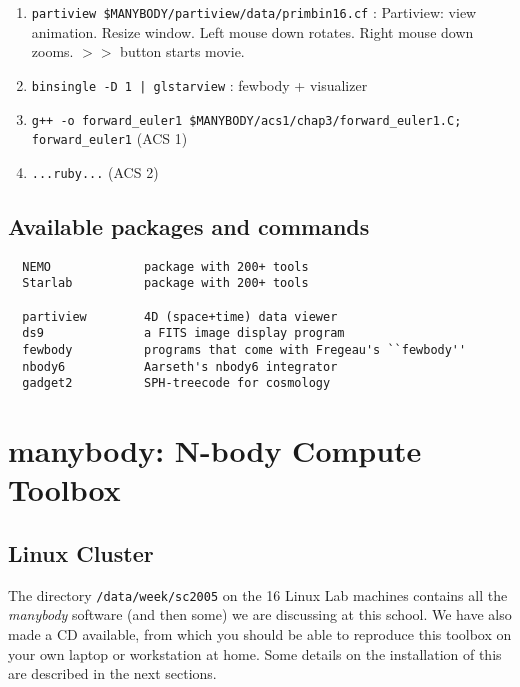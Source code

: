 \begin{enumerate}
\item
{\tt partiview  \$MANYBODY/partiview/data/primbin16.cf} : Partiview: view animation. Resize window.
Left mouse down rotates. Right mouse down zooms. $>>$ button starts movie.

\item
{\tt binsingle -D 1 | glstarview} : fewbody + visualizer

\item
{\tt g++ -o forward\_euler1 \$MANYBODY/acs1/chap3/forward\_euler1.C; forward\_euler1} 
(ACS 1)

\item
{\tt ...ruby...}
(ACS 2)


\end{enumerate}

\section{Available packages and commands}

\begin{verbatim}
  NEMO             package with 200+ tools
  Starlab          package with 200+ tools

  partiview        4D (space+time) data viewer
  ds9              a FITS image display program
  fewbody          programs that come with Fregeau's ``fewbody''
  nbody6           Aarseth's nbody6 integrator
  gadget2          SPH-treecode for cosmology
\end{verbatim}


\chapter                {manybody: N-body Compute Toolbox}



\section{Linux Cluster}

The directory {\tt /data/week/sc2005} on the 16 Linux Lab machines
contains all the {\it manybody} software (and then some)  
we are discussing at this school. We have
also made a CD available, from which you should be able to reproduce this
toolbox on your own laptop or workstation at home. 
Some details on the installation of this are described in the next sections.

